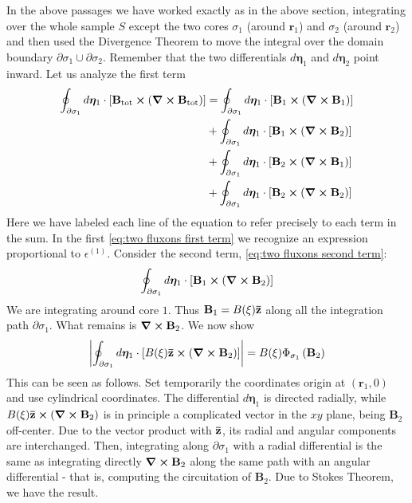 In the above passages we have worked exactly as in the above section, integrating over the whole sample $S$ except the two cores $\sigma_1$ (around $\mathbf{r}_1$) and $\sigma_2$ (around $\mathbf{r}_2$) and then used the Divergence Theorem to move the integral over the domain boundary $\partial\sigma_1\cup\partial\sigma_2$. Remember that the two differentials $d\bm\eta_1$ and $d\bm\eta_2$ point inward. Let us analyze the first term
\begin{align}
	\oint_{\partial\sigma_1} d\bm\eta_1 \cdot \left[{ \mathbf{B}_\mathrm{tot} \bm{\times} \left({\curl\mathbf{B}_\mathrm{tot}}\right) }\right] &= \oint_{\partial\sigma_1} d\bm\eta_1 \cdot \left[{ \mathbf{B}_1 \bm{\times} \left({\curl\mathbf{B}_1 }\right) }\right] \label{eq:two fluxons first term} \\
	&+ \oint_{\partial\sigma_1} d\bm\eta_1 \cdot \left[{ \mathbf{B}_1 \bm{\times} \left({\curl\mathbf{B}_2 }\right) }\right] \label{eq:two fluxons second term}\\
	&+ \oint_{\partial\sigma_1} d\bm\eta_1 \cdot \left[{ \mathbf{B}_2 \bm{\times} \left({\curl\mathbf{B}_1 }\right) }\right] \label{eq:two fluxons third term}\\
	&+ \oint_{\partial\sigma_1} d\bm\eta_1 \cdot \left[{ \mathbf{B}_2 \bm{\times} \left({\curl\mathbf{B}_2 }\right) }\right] \label{eq:two fluxons fourth term}
\end{align}
Here we have labeled each line of the equation to refer precisely to each term in the sum. In the first \eqref{eq:two fluxons first term} we recognize an expression proportional to $\epsilon^{(1)}$. Consider the second term, \eqref{eq:two fluxons second term}:
\[
	\oint_{\partial\sigma_1} d\bm\eta_1 \cdot \left[{ \mathbf{B}_1 \bm{\times} \left({\curl\mathbf{B}_2 }\right) }\right]
\]
We are integrating around core $1$. Thus $\mathbf{B}_1 = B(\xi) \mathbf{\bar{z}}$ along all the integration path $\partial\sigma_1$. What remains is $\curl\mathbf{B}_2$. We now show
\[
	\abs{\oint_{\partial\sigma_1} d\bm\eta_1 \cdot \left[{ B(\xi) \mathbf{\bar{z}} \bm\times  \left({\curl\mathbf{B}_2}\right) }\right]} = B(\xi)\Phi_{\sigma_1} \left({\mathbf{B}_2}\right)
\]
This can be seen as follows. Set temporarily the coordinates origin at $(\mathbf{r}_1,0)$ and use cylindrical coordinates. The differential $d\bm\eta_1$ is directed radially, while $B(\xi) \mathbf{\bar{z}} \bm\times  \left({\curl\mathbf{B}_2}\right)$ is in principle a complicated vector in the $xy$ plane, being $\mathbf{B}_2$ off-center. Due to the vector product with $\mathbf{\bar{z}}$, its radial and angular components are interchanged. Then, integrating along $\partial\sigma_1$ with a radial differential is the same as integrating directly $\curl\mathbf{B}_2$ along the same path with an angular differential - that is, computing the circuitation of $\mathbf{B}_2$. Due to Stokes Theorem, we have the result.

